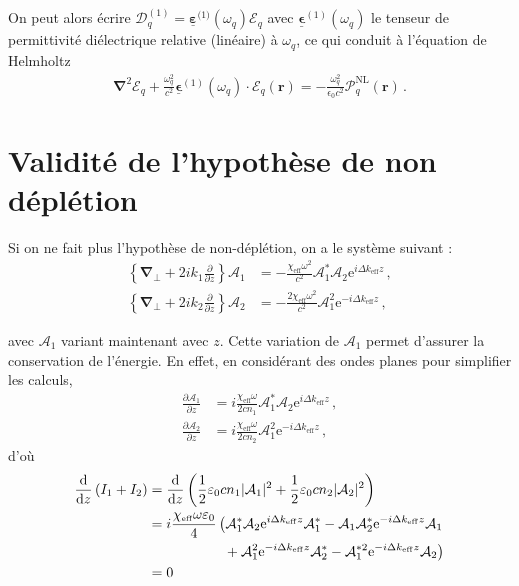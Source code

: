 \documentclass[11pt,a4paper]{article}
\newcommand{\pdv}[2]{\frac{\partial #1}{\partial #2}}
\newcommand{\chie}{\chi_\mathsc{eff}}
\newcommand{\dke}{\Delta k_\mathsc{eff}}
\newcommand{\E}{\mathcal{E}}
\newcommand{\A}{\mathcal{A}}
\newcommand{\e}[1]{\text{e}^{#1}}
\newcommand{\mathsc}[1]{\mathrm{\scriptscriptstyle {#1}}}
\renewcommand{\v}[1]{\boldsymbol{\mathbf{#1}}}
\newcommand{\tens}[1]{\boldsymbol{\underline{#1}}}
\begin{document}
On peut alors écrire $\v {\boldsymbol{\mathcal D}}^\mathsc{(1)}_q = \tens \varepsilon^{\mathsc(1)}(\omega_q) \v {\boldsymbol{\mathcal E}}_q$ avec $\tens \epsilon^{(1)}(\omega_q)$ le tenseur de permittivité diélectrique relative (linéaire) à $\omega_q$, ce qui conduit à l'équation de Helmholtz  \citep{boyd}
\begin{align}
	\boldsymbol{\nabla}^2 \boldsymbol{\E}_q + \frac{\omega_q^2}{c^2}\tens\epsilon^{(1)}(\omega_q)\cdot \v \E_q(\v r) = - \frac{\omega_q^2}{\epsilon_0 c^2} \boldsymbol{\mathcal{P}}^\mathsc{NL}_q(\v r) \,.
\end{align}

\section{Validité de l'hypothèse de non déplétion}
\label{ndepl}


Si on ne fait plus l'hypothèse de non-déplétion, on a le système suivant :
\begin{equation}
\begin{aligned}
\left\{\v\nabla_\bot + 2 i k_1 \frac{\partial}{\partial z} \right\} \A_1 &= - \frac{\chie \omega^2}{c^2} \A_1^* \A_2 \e{i \dke z} \,, \\
\left\{\v\nabla_\bot + 2 i k_2 \frac{\partial}{\partial z} \right\} \A_2 &= - \frac{2 \chie \omega^2}{c^2} \A_1^2 \e{- i \dke z} \,,
\end{aligned}
\end{equation}

avec $\A_1$ variant maintenant avec $z$. Cette variation de $\A_1$ permet d'assurer la conservation de l'énergie. 
En effet, en considérant des ondes planes pour simplifier les calculs,
\begin{equation}
\begin{aligned}
\pdv{\A_1}{z} &= i \frac{\chie \omega}{2cn_1} \A_1^* \A_2 \e{i \dke z} \,, \\
\pdv{\A_2}{z} &= i \frac{\chie \omega}{2cn_2} \A_1^2 \e{- i \dke z} \,,
\label{eq:depl}
\end{aligned}
\end{equation}
d'où
\begin{equation}
\begin{aligned}
\dv{}{z} \left(I_1 + I_2 \right) &= \dv{}{z} \left(\frac12 \varepsilon_0 c n_1 |\A_1|^2 + \frac12 \varepsilon_0 c n_2 |\A_2|^2 \right) \\
&= i \frac{\chie \omega \varepsilon_0}{4} \left( \A_1^* \A_2 \e{i \dke z} \A_1^* - \A_1 \A_2^* \e{-i \dke z} \A_1 \right. \\ 
&\quad\quad\quad\quad\quad\, \left. {}+ \A_1^2 \e{- i \dke z} \A_2^* - \A_1^{*2} \e{- i \dke z} \A_2 \right) \\
&= 0
\end{aligned}
\end{equation}
\end{document}
